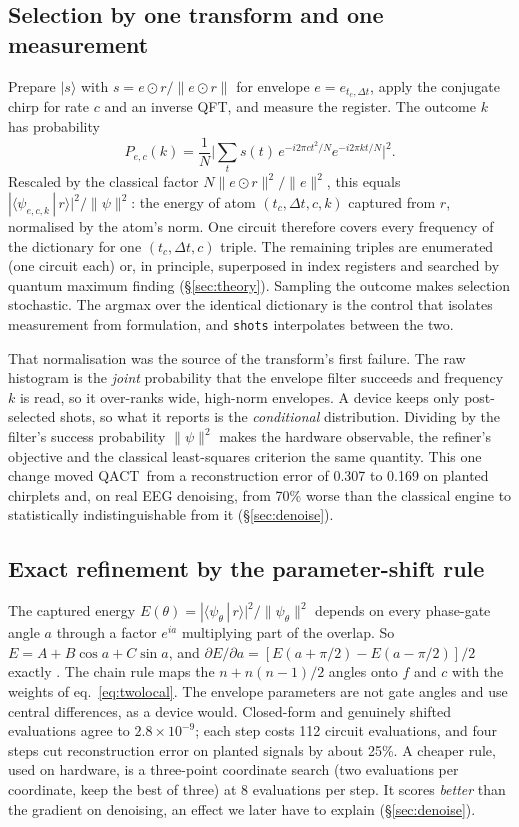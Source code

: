 \documentclass{article}
\newcommand{\qact}{QACT}
\newcommand{\ket}[1]{\lvert #1\rangle}
\newcommand{\braket}[2]{\langle #1\,|\,#2\rangle}
\newcommand{\norm}[1]{\lVert #1\rVert}
\begin{document}
\subsection{Selection by one transform and one measurement}
Prepare $\ket{s}$ with $s=e\odot r/\norm{e\odot r}$ for envelope $e=e_{t_c,\Delta t}$, apply the conjugate chirp for rate $c$ and an inverse QFT, and measure the register. The outcome $k$ has probability
\begin{equation}
P_{e,c}(k)=\frac{1}{N}\Big|\sum_t s(t)\,e^{-i2\pi ct^2/N}e^{-i2\pi kt/N}\Big|^2.
\label{eq:sampler}
\end{equation}
Rescaled by the classical factor $N\norm{e\odot r}^2/\norm{e}^2$, this equals $|\braket{\psi_{e,c,k}}{r}|^2/\norm{\psi}^2$: the energy of atom $(t_c,\Delta t,c,k)$ captured from $r$, normalised by the atom's norm. One circuit therefore covers every frequency of the dictionary for one $(t_c,\Delta t,c)$ triple. The remaining triples are enumerated (one circuit each) or, in principle, superposed in index registers and searched by quantum maximum finding \citep{durr1996minimum} (\S\ref{sec:theory}). Sampling the outcome makes selection stochastic. The argmax over the identical dictionary is the control that isolates measurement from formulation, and \texttt{shots} interpolates between the two.

That normalisation was the source of the transform's first failure. The raw histogram is the \emph{joint} probability that the envelope filter succeeds and frequency $k$ is read, so it over-ranks wide, high-norm envelopes. A device keeps only post-selected shots, so what it reports is the \emph{conditional} distribution. Dividing by the filter's success probability $\norm{\psi}^2$ makes the hardware observable, the refiner's objective and the classical least-squares criterion the same quantity. This one change moved \qact\ from a reconstruction error of 0.307 to 0.169 on planted chirplets and, on real EEG denoising, from 70\% worse than the classical engine to statistically indistinguishable from it (\S\ref{sec:denoise}).

\subsection{Exact refinement by the parameter-shift rule}
The captured energy $E(\theta)=|\braket{\psi_\theta}{r}|^2/\norm{\psi_\theta}^2$ depends on every phase-gate angle $a$ through a factor $e^{ia}$ multiplying part of the overlap. So $E=A+B\cos a+C\sin a$, and $\partial E/\partial a=[E(a+\pi/2)-E(a-\pi/2)]/2$ exactly \citep{mitarai2018circuit,schuld2019evaluating}. The chain rule maps the $n+n(n-1)/2$ angles onto $f$ and $c$ with the weights of eq.~\eqref{eq:twolocal}. The envelope parameters are not gate angles and use central differences, as a device would. Closed-form and genuinely shifted evaluations agree to $2.8\times10^{-9}$; each step costs 112 circuit evaluations, and four steps cut reconstruction error on planted signals by about 25\%. A cheaper rule, used on hardware, is a three-point coordinate search (two evaluations per coordinate, keep the best of three) at 8 evaluations per step. It scores \emph{better} than the gradient on denoising, an effect we later have to explain (\S\ref{sec:denoise}).
\end{document}
